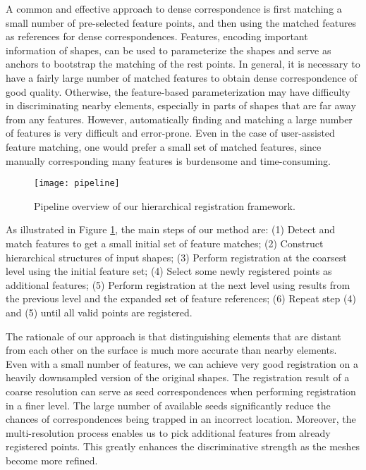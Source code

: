 A common and effective approach to dense correspondence is first matching a small number of pre-selected feature points, and then using the matched features as references for dense correspondences. Features, encoding important information of shapes, can be used to parameterize the shapes and serve as anchors to bootstrap the matching of the rest points. In general, it is necessary to have a fairly large number of matched features to obtain dense correspondence of good quality. Otherwise, the feature-based parameterization may have difficulty in discriminating nearby elements, especially in parts of shapes that are far away from any features. However, automatically finding and matching a large number of features is very difficult and error-prone. Even in the case of user-assisted feature matching, one would prefer a small set of matched features, since manually corresponding many features is burdensome and time-consuming.

\begin{figure}
\centering
  \texttt{[image: pipeline]}
  \caption{Pipeline overview of our hierarchical registration framework.}
\label{fig:pipe}
\end{figure}

As illustrated in Figure \ref{fig:pipe}, the main steps of our method are: (1) Detect and match features to get a small initial set of feature matches; (2) Construct hierarchical structures of input shapes; (3) Perform registration at the coarsest level using the initial feature set; (4) Select some newly registered points as additional features; (5) Perform registration at the next level using results from the previous level and the expanded set of feature references; (6) Repeat step (4) and (5) until all valid points are registered.

The rationale of our approach is that distinguishing elements that are distant from each other on the surface is much more accurate than nearby elements. Even with a small number of features, we can achieve very good registration on a heavily downsampled version of the original shapes. The registration result of a coarse resolution can serve as seed correspondences when performing registration in a finer level. The large number of available seeds significantly reduce the chances of correspondences being trapped in an incorrect location. Moreover, the multi-resolution process enables us to pick additional features from already registered points. This greatly enhances the discriminative strength as the meshes become more refined.

